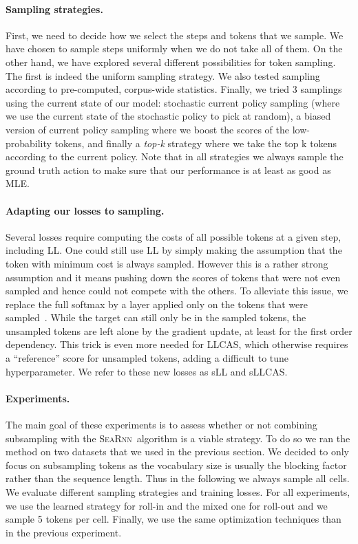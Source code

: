\documentclass{article}
\newcommand{\SEARNN}{\textsc{SeaRnn}}
\begin{document}
	\vspace{-1mm}
	\paragraph{Sampling strategies.}
	First, we need to decide how we select the steps and tokens that we sample.
	We have chosen to sample steps uniformly when we do not take all of them.
	On the other hand, we have explored several different possibilities for token sampling.
	The first is indeed the uniform sampling strategy.
	We also tested sampling according to pre-computed, corpus-wide statistics.
	Finally, we tried 3 samplings using the current state of our model: stochastic current policy sampling (where we use the current state of the stochastic policy to pick at random), a biased version of current policy sampling where we boost the scores of the low-probability tokens, and finally a \emph{top-k} strategy where we take the top k tokens according to the current policy.
	Note that in all strategies we always sample the ground truth action to make sure that our performance is at least as good as MLE.

	\vspace{-1mm}
	\paragraph{Adapting our losses to sampling.}
	Several losses require computing the costs of all possible tokens at a given step, including LL.
	One could still use LL by simply making the assumption that the token with minimum cost is always sampled.
	However this is a rather strong assumption and it means pushing down the scores of tokens that were not even sampled and hence could not compete with the others.
	To alleviate this issue, we replace the full softmax by a layer applied only on the tokens that were sampled~\citep{Jean2015}.
	While the target can still only be in the sampled tokens, the unsampled tokens are left alone by the gradient update, at least for the first order dependency.
	This trick is even more needed for LLCAS, which otherwise requires a ``reference'' score for unsampled tokens, adding a difficult to tune hyperparameter.
	We refer to these new losses as sLL and sLLCAS.

	\vspace{-1mm}
	\paragraph{Experiments.}
	The main goal of these experiments is to assess whether or not combining subsampling with the \SEARNN\ algorithm is a viable strategy.
	To do so we ran the method on two datasets that we used in the previous section.
	We decided to only focus on subsampling tokens as the vocabulary size is usually the blocking factor rather than the sequence length.
	Thus in the following we always sample all cells.
	We evaluate different sampling strategies and training losses.
	For all experiments, we use the learned strategy for roll-in and the mixed one for roll-out and we sample 5 tokens per cell.
	Finally, we use the same optimization techniques than in the previous experiment.
\end{document}
